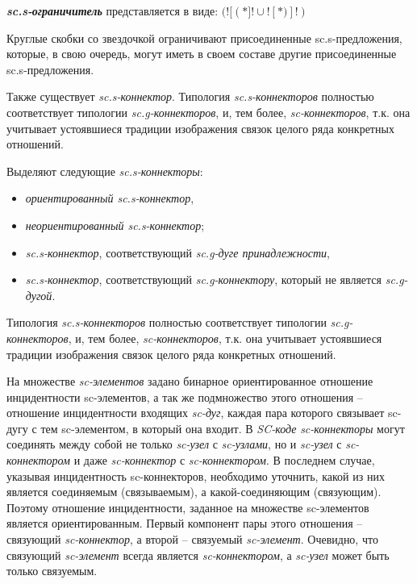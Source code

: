\bigskip
\textbf{\textit{sc.s-ограничитель}} представляется в виде: $(![  (\ast ]! \cup ![  \ast) ]!)$

Круглые скобки со звездочкой ограничивают присоединенные sc.s-предложения, которые, в свою очередь, могут иметь в своем составе другие присоединенные sc.s-предложения.

Также существует \textit{\textit{sc.s-коннектор}}. Типология \textit{\textit{sc.s-коннектор}ов} полностью соответствует типологии \textit{sc.g-коннекторов}, и, тем более, \textit{sc-коннекторов}, т.к. она учитывает устоявшиеся традиции изображения связок целого ряда конкретных отношений.

\begin{SCn}
\end{SCn}

Выделяют следующие \textit{sc.s-коннекторы}:
\begin{itemize}
	\item \textit{ориентированный \textit{sc.s-коннектор}},
	\item \textit{неориентированный \textit{sc.s-коннектор}};
	\item \textit{\textit{sc.s-коннектор}}, соответствующий \textit{sc.g-дуге принадлежности},
	\item \textit{\textit{sc.s-коннектор}}, соответствующий \textit{sc.g-коннектору}, который не является \textit{sc.g-дугой}.
\end{itemize}

Типология \textit{sc.s-коннекторов} полностью соответствует типологии \textit{sc.g-коннекторов}, и, тем более, \textit{sc-коннекторов}, т.к. она учитывает устоявшиеся традиции изображения связок целого ряда конкретных отношений.

На множестве \textit{sc-элементов} задано бинарное ориентированное отношение инцидентности sc-элементов, а так же подмножество этого отношения – отношение инцидентности входящих \textit{sc-дуг}, каждая пара которого связывает sc-дугу с тем sc-элементом, в который она входит. В \textit{SC-коде} \textit{sc-коннекторы} могут соединять между собой не только \textit{sc-узел} с \textit{sc-узлами}, но и \textit{sc-узел} с \textit{sc-коннектором} и даже \textit{sc-коннектор} с \textit{sc-коннектором}. В последнем случае, указывая инцидентность sc-коннекторов, необходимо уточнить, какой из них является соединяемым (связываемым), а какой-соединяющим (связующим). Поэтому отношение инцидентности, заданное на множестве sc-элементов является ориентированным. Первый компонент пары этого отношения – связующий \textit{sc-коннектор}, а второй – связуемый \textit{sc-элемент}. Очевидно, что связующий \textit{sc-элемент} всегда является \textit{sc-коннектором}, а \textit{sc-узел} может быть только связуемым.

